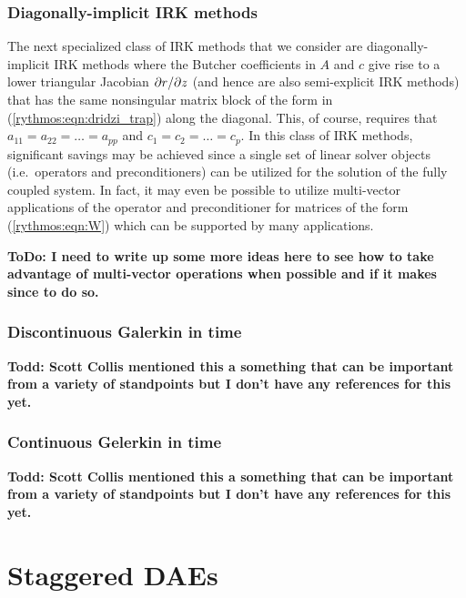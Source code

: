\documentclass[pdf,ps2pdf,11pt]{SANDreport}
\begin{document}
\subsubsection*{Diagonally-implicit IRK methods}

The next specialized class of IRK methods that we consider are
diagonally-implicit IRK methods where the Butcher coefficients in $A$ and $c$
give rise to a lower triangular Jacobian $\partial r / \partial z$ (and hence are also
semi-explicit IRK methods) that has the same nonsingular matrix block of the
form in (\ref{rythmos:eqn:dridzi_trap}) along the diagonal.  This, of course,
requires that $a_{11} = a_{22} = {}\ldots = a_{pp}$ and $c_{1} = c_{2} =
{}\ldots = c_{p}$.  In this class of IRK methods, significant savings may be
achieved since a single set of linear solver objects (i.e.\ operators and
preconditioners) can be utilized for the solution of the fully coupled system.
In fact, it may even be possible to utilize multi-vector applications of the
operator and preconditioner for matrices of the form (\ref{rythmos:eqn:W})
which can be supported by many applications.

{}\textbf{ToDo: I need to write up some more ideas here to see how to take
advantage of multi-vector operations when possible and if it makes since to do
so.}

\subsubsection{Discontinuous Galerkin in time}

\cite{DGTime}
{}\textbf{Todd: Scott Collis mentioned this a something that can be important
from a variety of standpoints but I don't have any references for this yet.}

\subsubsection{Continuous Gelerkin in time }

\cite{CGTime}
{}\textbf{Todd: Scott Collis mentioned this a something that can be important
from a variety of standpoints but I don't have any references for this yet.}


\section{Staggered DAEs}
\label{rythmos:sec:staggered-daes}
\end{document}
